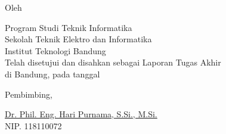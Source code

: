\clearpage
\pagestyle{empty}

\begin{center}
	\smallskip

	\Large \bfseries \MakeUppercase{\thetitle}
	\vfill


	\large Oleh

	\Large \theauthor

	\large Program Studi Teknik Informatika \\

	\normalsize \normalfont
	Sekolah Teknik Elektro dan Informatika \\
	Institut Teknologi Bandung \\

	\vfill
	\normalsize \normalfont
	Telah disetujui dan disahkan sebagai Laporan Tugas Akhir \\
	di Bandung, pada tanggal \tanggalpengesahan

	\vspace{0.5cm}
	Pembimbing,

	\vfill
	\underline{Dr. Phil. Eng. Hari Purnama, S.Si., M.Si.} \\
	NIP. 118110072

\end{center}
\clearpage
